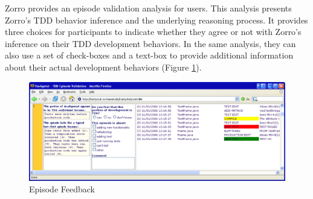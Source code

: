 Zorro provides an episode validation analysis for users. This analysis
presents Zorro's TDD behavior inference and the underlying reasoning
process. It provides three choices for participants to indicate whether
they agree or not with Zorro's inference on their TDD development
behaviors. In the same analysis, they can also use a set of check-boxes
and a text-box to provide additional information about their actual 
development behaviors (Figure \ref{fig:EpisodeFeedback}).
\begin{figure}[htbp]
  \centering
  \includegraphics[width=1.0\textwidth]{figs/EpisodeFeedback}
  \caption{Episode Feedback}\label{fig:EpisodeFeedback}
\end{figure}

